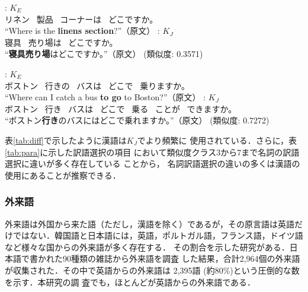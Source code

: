 \begin{exe}
 \ex
 \begin{xlist}
  \ex\label{kango:eng} 
  \gll {}  
  : $K_E$\\
  リネン~ 製品~ コーナーは~ どこですか。 　\\
  \trans    ``Where is the {\bf linens section}?''（原文）
  \ex\label{kango:ja}  
  \gll {}  : $K_J$\\
  寝具~ 売り場は~ どこですか。 　\\
  \trans    ``{\bf 寝具売り場}はどこですか。''（原文）
  \hfill (類似度: 0.3571)
  
 \end{xlist}
 \ex
 \begin{xlist}
  \ex\label{bound:eng} 
  \gll {}   
  : $K_E$\\
  ボストン~ 行きの~ バスは~ どこで~ 乗りますか。\\
  \trans  ``Where can I catch a bus {\bf to go} to Boston?''（原文）
  \ex\label{yuki:ja}
  \gll {}    
   : $K_J$\\ 
  ボストン~ 行き~ バスは~ どこで~ 乗る~ ことが~ できますか。\\
  \trans ``ボストン{\bf 行き}のバスにはどこで乗れますか。''（原文）\hfill
  (類似度: 0.7272)
 \end{xlist}
\end{exe} 

表\ref{tab:diff}で示したように漢語は$K_J$でより頻繁に
使用されている．さらに，表\ref{tab:para}に示した訳語選択の項目
において類似度クラス3から7まで名詞の訳語選択に違いが多く存在している
ことから，
名詞訳語選択の違いの多くは漢語の使用にあることが推察できる．

\subsubsection{外来語}
\label{sec:loan_word}
外来語は外国から来た語（ただし，漢語を除く）であるが，その原言語は英語だ
けではない．韓国語と日本語には，英語，ポルトガル語，フランス語，ドイツ語
など様々な国からの外来語が多く存在する．
その割合を示した研究がある．日本語で書かれた90種類の雑誌から外来語を調査
した結果，合計2,964個の外来語が収集された．その中で英語からの外来語は
2,395語 (約80\%)という圧倒的な数を示す\cite{Shibatani:1990}．本研究の調
査でも，ほとんどが英語からの外来語である．

